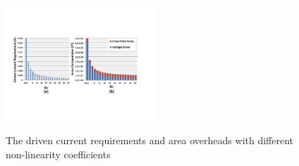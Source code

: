 %
\begin{figure}%
\centering
  \includegraphics[width=0.5\textwidth]{./figures/area_all.pdf}\\
  \vspace{-5pt}
  \caption{The driven current requirements and area overheads with different non-linearity coefficients}\label{fig:area_all}
 \vspace{-15pt}
\end{figure}




